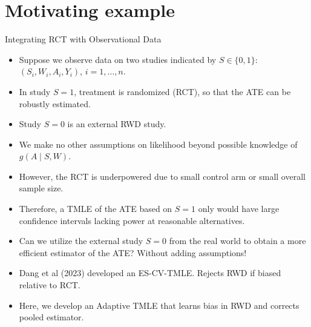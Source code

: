 \documentclass[t]{beamer}
\begin{document}

\section{Motivating example}
\begin{frame}{Integrating RCT with Observational Data}\begin{itemize}\item Suppose we observe data on two studies indicated by $S\in \{0,1\}$: $(S_i,W_i,A_i,Y_i)$, $i=1,\ldots,n$. 
\item In study $S=1$, treatment is randomized (RCT), so that the ATE can be robustly estimated.
\item Study $S=0$ is an external RWD study. 
\item  We make no other assumptions on likelihood beyond possible knowledge of $g(A\mid S,W)$.
\item However, the RCT is underpowered due to small control arm or small overall sample size.\item Therefore, a TMLE of the ATE based on $S=1$ only would have large confidence intervals lacking power at reasonable alternatives. \item Can we utilize the external study $S=0$ from the real world to obtain a more efficient estimator of the ATE?  Without adding assumptions!
\end{itemize}
\end{frame}
\begin{frame}
\begin{itemize}
\item Dang et al (2023) developed an ES-CV-TMLE. Rejects RWD if biased relative to RCT.
\item Here, we develop an Adaptive TMLE that learns bias in RWD and corrects pooled estimator.
\end{itemize}\end{frame}
\end{document}

